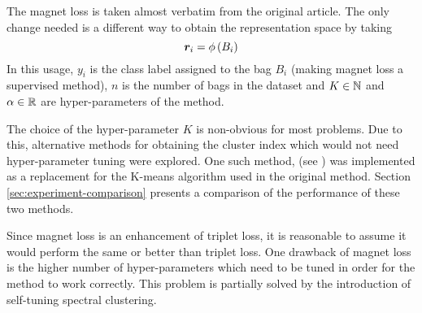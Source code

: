 The magnet loss is taken almost verbatim from the original article. The only change needed is a different way to obtain the representation space by taking
\[ \bm{r}_i = \phi \left( B_i \right) \]
In this usage, \( y_i \) is the class label assigned to the bag \( B_i \) (making magnet loss a supervised method), \( n \) is the number of bags in the dataset and \( K \in \mathbb{N} \) and \( \alpha \in \mathbb{R} \) are hyper-parameters of the method.

The choice of the hyper-parameter \( K \) is non-obvious for most problems. Due to this, alternative methods for obtaining the cluster index which would not need hyper-parameter tuning were explored. One such method,  (see \cite{zelnik-manor_self-tuning_2005}) was implemented as a replacement for the K-means algorithm used in the original method. Section \ref{sec:experiment-comparison} presents a comparison of the performance of these two methods.

Since magnet loss is an enhancement of triplet loss, it is reasonable to assume it would perform the same or better than triplet loss. One drawback of magnet loss is the higher number of hyper-parameters which need to be tuned in order for the method to work correctly. This problem is partially solved by the introduction of self-tuning spectral clustering.
